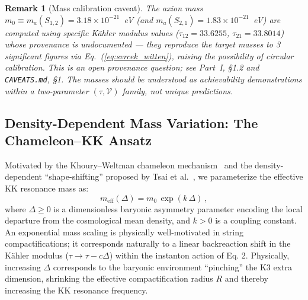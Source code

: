 \documentclass[12pt]{article}
\newtheorem{remark}{Remark}
\begin{document}
\begin{remark}[Mass calibration caveat]
\label{rem:mass_caveat}
The axion mass $m_0 \equiv m_a(S_{1,2}) = 3.18 \times 10^{-21}$~eV (and $m_a(S_{2,1}) = 1.83 \times 10^{-21}$~eV) are computed using specific K\"ahler modulus values ($\tau_{12} = 33.6255$, $\tau_{21} = 33.8014$) whose provenance is undocumented --- they reproduce the target masses to 3 significant figures via Eq.~(\ref{eq:svrcek_witten}), raising the possibility of circular calibration.
This is an open provenance question; see Part~I, \S1.2 and \texttt{CAVEATS.md}, \S1.
The masses should be understood as \emph{achievability demonstrations} within a two-parameter $(\tau, \mathcal{V})$ family, not unique predictions.
\end{remark}

\subsection{Density-Dependent Mass Variation: The Chameleon--KK Ansatz}
\label{sec:chameleon_ansatz}

Motivated by the Khoury--Weltman chameleon mechanism~\cite{khoury2004a, khoury2004b} and the density-dependent ``shape-shifting'' proposed by Tsai et al.~\cite{tsai2026}, we parameterize the effective KK resonance mass as:
\begin{equation}
\label{eq:meff}
m_{\mathrm{eff}}(\Delta) = m_0 \, \exp\!\left(k \, \Delta\right)\,,
\end{equation}
where $\Delta \geq 0$ is a dimensionless baryonic asymmetry parameter encoding the local departure from the cosmological mean density, and $k > 0$ is a coupling constant.
An exponential mass scaling is physically well-motivated in string compactifications; it corresponds naturally to a linear backreaction shift in the K\"ahler modulus ($\tau \to \tau - c\Delta$) within the instanton action of Eq. 2.
Physically, increasing $\Delta$ corresponds to the baryonic environment ``pinching'' the K3 extra dimension, shrinking the effective compactification radius $R$ and thereby increasing the KK resonance frequency.
\end{document}
